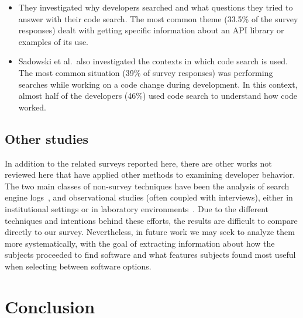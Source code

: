\documentclass{casicswhitepaper}
\begin{document}
\begin{itemize}

\item They investigated why developers searched and what questions they tried to answer with their code search.  The most common theme (33.5\% of the survey responses) dealt with getting specific information about an API library or examples of its use.

\item Sadowski et al.\ also investigated the contexts in which code search is used.  The most common situation (39\% of survey responses) was performing searches while working on a code change during development.  In this context, almost half of the developers (46\%) used code search to understand how code worked.

\end{itemize}


\subsection{Other studies}

In addition to the related surveys reported here, there are other works not reviewed here that have applied other methods to examining developer behavior.  The two main classes of non-survey techniques have been the analysis of search engine logs~\cite{bajrachary_2009, bajracharya2012analyzing, jansen_2006, teevan_2004, brandt2009two, brandt2010example, Li2009751, ge2014developers, volske2015users}, and observational studies (often coupled with interviews), either in institutional settings or in laboratory environments~\cite{sim_2011, brandt2009two, banker1993repository, gallardo2013software, sherif2003barriers, pohthong2001reuse, sim2013controlled, murphyhill2015how, sim2011getting, dabbish_2012}.  Due to the different techniques and intentions behind these efforts, the results are difficult to compare directly to our survey.  Nevertheless, in future work we may seek to analyze them more systematically, with the goal of extracting information about how the subjects proceeded to find software and what features subjects found most useful when selecting between software options.


\section{Conclusion}
\label{conclusion}
\end{document}
